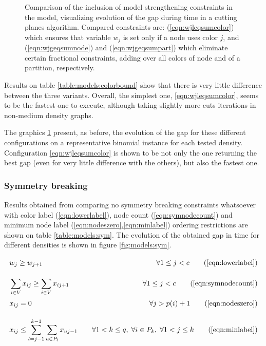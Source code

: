 \begin{figure}
\caption{Comparison of the inclusion of model strengthening constraints in the model, visualizing evolution of the gap during time in a cutting planes algorithm. Compared constraints are: (\ref{eqn:wjleqsumcolor}) which ensures that variable $w_j$ is set only if a node uses color $j$, and (\ref{eqn:wjgeqsumnode}) and (\ref{eqn:wjgeqsumpart}) which eliminate certain fractional constraints, adding over all colors of node and of a partition, respectively.}
\label{fig:models:colorbound}
\end{figure}

Results on table \ref{table:models:colorbound} show that there is very little difference between the three variants. Overall, the simplest one, \ref{eqn:wjleqsumcolor}, seems to be the fastest one to execute, although taking slightly more cuts iterations in non-medium density graphs. 

The graphics \ref{fig:models:colorbound} present, as before, the evolution of the gap for these different configurations on a representative binomial instance for each tested density. Configuration \ref{eqn:wjleqsumcolor} is shown to be not only the one returning the best gap (even for very little difference with the others), but also the fastest one.

\subsubsection{Symmetry breaking}

Results obtained from comparing no symmetry breaking constraints whatsoever with color label (\ref{eqn:lowerlabel}), node count (\ref{eqn:symnodecount}) and minimum node label (\ref{eqn:nodeszero},\ref{eqn:minlabel}) ordering restrictions are shown on table \ref{table:models:sym}. The evolution of the obtained gap in time for different densities is shown in figure \ref{fig:models:sym}.

\begin{align*}
& w_j \geq w_{j+1} \sumheight \quad &\forall 1 \leq j < c \tag{\ref{eqn:lowerlabel}} \\
& \sum_{i \in V} x_{ij} \geq \sum_{i \in V} x_{ij+1} \quad &\forall 1 \leq j < c \tag{\ref{eqn:symnodecount}} \\
& x_{ij} = 0 \sumheight \quad &\forall j > p(i) + 1 \tag{\ref{eqn:nodeszero}} \\
& x_{ij} \leq \sum_{l = j-1}^{k-1} \sum_{u \in P_l} x_{uj-1} \quad &\forall 1 < k \leq q, \; \forall i \in P_k, \; \forall 1 < j \leq k \tag{\ref{eqn:minlabel}}
\end{align*}

